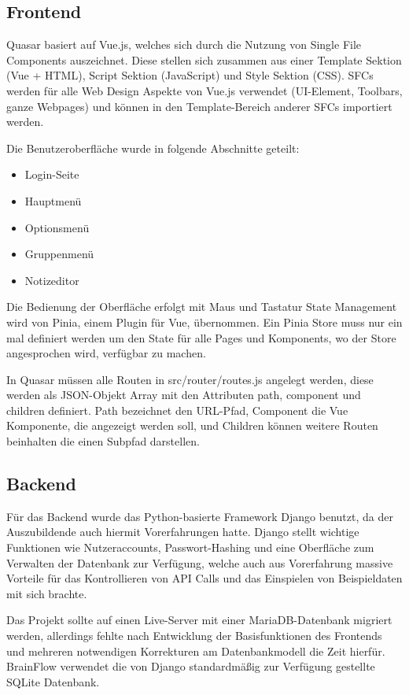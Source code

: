 \subsection{Frontend}
Quasar basiert auf Vue.js, welches sich durch die Nutzung von Single File Components auszeichnet. Diese stellen sich zusammen aus einer Template Sektion (Vue + HTML),
Script Sektion (JavaScript) und Style Sektion (CSS). SFCs werden für alle Web Design Aspekte von Vue.js verwendet (UI-Element, Toolbars, ganze Webpages) und können in
den Template-Bereich anderer SFCs importiert werden.

\bigskip\noindent
Die Benutzeroberfläche wurde in folgende Abschnitte geteilt:
\begin{itemize}
    \item Login-Seite
    \item Hauptmenü
    \item Optionsmenü
    \item Gruppenmenü
    \item Notizeditor
\end{itemize}

\bigskip\noindent
Die Bedienung der Oberfläche erfolgt mit Maus und Tastatur State Management wird von Pinia, einem Plugin für Vue, übernommen.
Ein Pinia Store muss nur ein mal definiert werden um den State für alle Pages und Komponents, wo der Store angesprochen wird, verfügbar zu machen.

\bigskip\noindent
In Quasar müssen alle Routen in src/router/routes.js angelegt werden, diese werden als JSON-Objekt Array mit den Attributen path, component und children definiert.
Path bezeichnet den URL-Pfad, Component die Vue Komponente, die angezeigt werden soll, und Children können weitere Routen beinhalten die einen Subpfad darstellen.
        
\subsection{Backend}
    Für das Backend wurde das Python-basierte Framework Django benutzt, da der Auszubildende auch hiermit Vorerfahrungen hatte. Django stellt wichtige Funktionen
    wie Nutzeraccounts, Passwort-Hashing und eine Oberfläche zum Verwalten der Datenbank zur Verfügung, welche auch aus Vorerfahrung massive Vorteile für das
    Kontrollieren von API Calls und das Einspielen von Beispieldaten mit sich brachte.

    \bigskip\noindent
    Das Projekt sollte auf einen Live-Server mit einer MariaDB-Datenbank migriert werden, allerdings fehlte nach Entwicklung der Basisfunktionen des Frontends und
    mehreren notwendigen Korrekturen am Datenbankmodell die Zeit hierfür. BrainFlow verwendet die von Django standardmäßig zur Verfügung gestellte SQLite Datenbank.